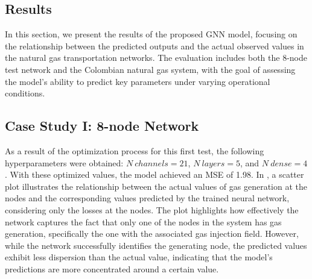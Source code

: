 

\subsection{Results}

In this section, we present the results of the proposed GNN model, focusing on the relationship between the predicted outputs and the actual observed values in the natural gas transportation networks. The evaluation includes both the 8-node test network and the Colombian natural gas system, with the goal of assessing the model's ability to predict key parameters under varying operational conditions. 


%
%     
%

\subsection{Case Study I: 8-node Network}


As a result of the optimization process for this first test, the following hyperparameters were obtained: $N \ channels=21$, $N \ layers=5$, and $N \ dense=4$. With these optimized values, the model achieved an MSE of 1.98. In , a scatter plot illustrates the relationship between the actual values of gas generation at the nodes and the corresponding values predicted by the trained neural network, considering only the losses at the nodes. The plot highlights how effectively the network captures the fact that only one of the nodes in the system has gas generation, specifically the one with the associated gas injection field. However, while the network successfully identifies the generating node, the predicted values exhibit less dispersion than the actual value, indicating that the model's predictions are more concentrated around a certain value.



